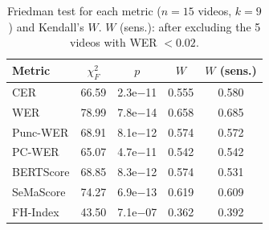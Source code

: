 \begin{table}[!t]
\centering
\caption{Friedman test for each metric ($n=15$ videos, $k=9$) and Kendall's $W$. $W$ (sens.): after excluding the 5 videos with WER $<0.02$.}
\label{tab:friedman}
\scriptsize
\begin{tabular}{lcccc}
\hline
Metric & $\chi^2_F$ & $p$ & $W$ & $W$ (sens.) \\
\hline
CER & 66.59 & 2.3e$-$11 & 0.555 & 0.580 \\
WER & 78.99 & 7.8e$-$14 & 0.658 & 0.685 \\
Punc-WER & 68.91 & 8.1e$-$12 & 0.574 & 0.572 \\
PC-WER & 65.07 & 4.7e$-$11 & 0.542 & 0.542 \\
BERTScore & 68.85 & 8.3e$-$12 & 0.574 & 0.531 \\
SeMaScore & 74.27 & 6.9e$-$13 & 0.619 & 0.609 \\
FH-Index & 43.50 & 7.1e$-$07 & 0.362 & 0.392 \\
\hline
\end{tabular}
\end{table}
